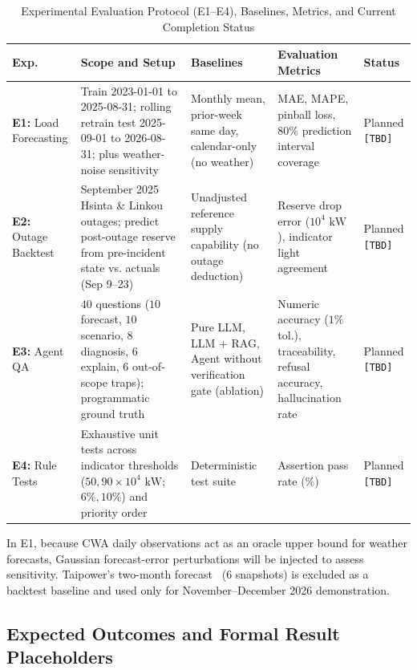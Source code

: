 \documentclass[conference]{IEEEtran}
\begin{document}
\begin{table}[t]
\centering
\caption{Experimental Evaluation Protocol (E1--E4), Baselines, Metrics, and Current Completion Status}
\label{tab:experiments}
\renewcommand{\arraystretch}{1.15}
\begin{tabularx}{\textwidth}{@{}p{1.75cm}>{\raggedright\arraybackslash}X>{\raggedright\arraybackslash}X>{\raggedright\arraybackslash}Xp{1.75cm}@{}}
\toprule
\textbf{Exp.} & \textbf{Scope and Setup} & \textbf{Baselines} & \textbf{Evaluation Metrics} & \textbf{Status} \\
\midrule
\textbf{E1:} Load Forecasting & Train 2023-01-01 to 2025-08-31; rolling retrain test 2025-09-01 to 2026-08-31; plus weather-noise sensitivity & Monthly mean, prior-week same day, calendar-only (no weather) & MAE, MAPE, pinball loss, $80\%$ prediction interval coverage & Planned \texttt{[TBD]} \\
\textbf{E2:} Outage Backtest & September 2025 Hsinta \& Linkou outages; predict post-outage reserve from pre-incident state vs. actuals (Sep 9--23) & Unadjusted reference supply capability (no outage deduction) & Reserve drop error ($10^4\text{ kW}$), indicator light agreement & Planned \texttt{[TBD]} \\
\textbf{E3:} Agent QA & $40$ questions ($10$ forecast, $10$ scenario, $8$ diagnosis, $6$ explain, $6$ out-of-scope traps); programmatic ground truth & Pure LLM, LLM + RAG, Agent without verification gate (ablation) & Numeric accuracy ($1\%$ tol.), traceability, refusal accuracy, hallucination rate & Planned \texttt{[TBD]} \\
\textbf{E4:} Rule Tests & Exhaustive unit tests across indicator thresholds ($50, 90 \times 10^4\text{ kW}$; $6\%, 10\%$) and priority order & Deterministic test suite & Assertion pass rate ($\%$) & Planned \texttt{[TBD]} \\
\bottomrule
\end{tabularx}
\end{table}

In E1, because CWA daily observations act as an oracle upper bound for weather forecasts, Gaussian forecast-error perturbations will be injected to assess sensitivity. Taipower's two-month forecast~\cite{ref2} ($6$ snapshots) is excluded as a backtest baseline and used only for November--December 2026 demonstration.

\subsection{Expected Outcomes and Formal Result Placeholders}
\label{sec:expected_outcomes}
\end{document}
